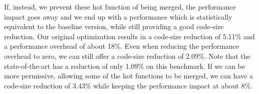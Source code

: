 If, instead, we prevent these hot function of being merged, the performance
impact goes away and we end up with a performance which is statistically
equivalent to the baseline version, while still providing a good code-size
reduction.
Our original optimization results in a code-size reduction of 5.11\% and a
performance overhead of about 18\%.
Even when reducing the performance overhead to zero, we can still offer a
code-size reduction of 2.09\%.
Note that the state-of-the-art has a reduction of only 1.09\% on this benchmark.
If we can be more permissive, allowing some of the hot functions to be merged,
we can have a code-size reduction of 3.43\% while keeping the performance impact
at about 8\%.





